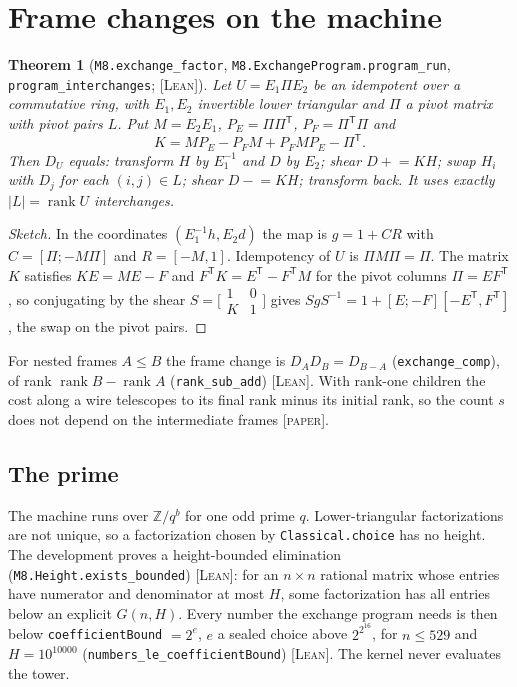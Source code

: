 \documentclass[11pt]{amsart}
\newtheorem{theorem}{Theorem}[section]
\theoremstyle{remark}
\newcommand{\Z}{\mathbb{Z}}
\newcommand{\lean}[1]{\texttt{#1}}
\newcommand{\tagL}{\textsc{[Lean]}}
\newcommand{\tagP}{\textsc{[paper]}}
\begin{document}
\section{Frame changes on the machine}\label{sec:exchange}

\begin{theorem}[\lean{M8.exchange\_factor}, \lean{M8.ExchangeProgram.program\_run},
\lean{program\_interchanges}; \tagL]\label{thm:exchange}
Let $U = E_1 \Pi E_2$ be an idempotent over a commutative ring, with $E_1, E_2$ invertible lower
triangular and $\Pi$ a pivot matrix with pivot pairs $L$. Put $M = E_2 E_1$, $P_E = \Pi\Pi^{\mathsf
T}$, $P_F = \Pi^{\mathsf T}\Pi$ and
\[
  K = M P_E - P_F M + P_F M P_E - \Pi^{\mathsf T}.
\]
Then $D_U$ equals: transform $H$ by $E_1^{-1}$ and $D$ by $E_2$; shear $D \mathrel{+}= KH$; swap
$H_i$ with $D_j$ for each $(i, j) \in L$; shear $D \mathrel{-}= KH$; transform back. It uses
exactly $|L| = \operatorname{rank} U$ interchanges.
\end{theorem}

\begin{proof}[Sketch]
In the coordinates $(E_1^{-1}h, E_2 d)$ the map is $g = 1 + CR$ with $C = [\Pi; -M\Pi]$ and
$R = [-M, 1]$. Idempotency of $U$ is $\Pi M \Pi = \Pi$. The matrix $K$ satisfies $KE = ME - F$
and $F^{\mathsf T}K = E^{\mathsf T} - F^{\mathsf T}M$ for the pivot columns $\Pi = EF^{\mathsf
T}$, so conjugating by the shear $S = \bigl[\begin{smallmatrix}1&0\\K&1\end{smallmatrix}\bigr]$
gives $SgS^{-1} = 1 + [E; -F][-E^{\mathsf T}, F^{\mathsf T}]$, the swap on the pivot pairs.
\end{proof}

For nested frames $A \le B$ the frame change is $D_A D_B = D_{B-A}$ (\lean{exchange\_comp}), of
rank $\operatorname{rank} B - \operatorname{rank} A$ (\lean{rank\_sub\_add}) \tagL. With rank-one
children the cost along a wire telescopes to its final rank minus its initial rank, so the count
$s$ does not depend on the intermediate frames \tagP.

\subsection{The prime}
The machine runs over $\Z/q^b$ for one odd prime $q$. Lower-triangular factorizations are not
unique, so a factorization chosen by \lean{Classical.choice} has no height. The development
proves a height-bounded elimination (\lean{M8.Height.exists\_bounded}) \tagL: for an $n \times n$
rational matrix whose entries have numerator and denominator at most $H$, some factorization has
all entries below an explicit $G(n, H)$. Every number the exchange program needs is then below
\lean{coefficientBound} $= 2^{e}$, $e$ a sealed choice above $2^{2^{16}}$, for $n \le 529$ and $H
= 10^{10000}$ (\lean{numbers\_le\_coefficientBound}) \tagL. The kernel never evaluates the
tower.
\end{document}
